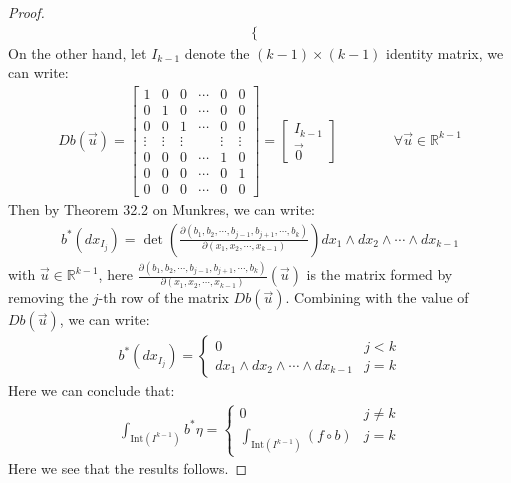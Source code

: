 \documentclass[15pt]{book}
\theoremstyle{break}
\theoremstyle{break}
\newcommand{\R}{\mathbb{R}}
\newcommand{\Int}{\text{Int}}
\newcommand{\bmat}[1]{\begin{bmatrix} #1 \end{bmatrix}}
\begin{document}
\begin{proof}
\begin{align*}
\begin{cases}
\end{cases}
\end{align*}
On the other hand, let $I_{k-1}$ denote the $(k-1)\times (k-1)$ identity matrix, we can write:
\begin{align*}
Db(\vec{u}) =\bmat{1&0&0 & \cdots & 0& 0\\
0&1&0 & \cdots & 0& 0\\
0&0&1 & \cdots & 0& 0\\
\vdots&\vdots&\vdots & & \vdots& \vdots\\
0&0&0 & \cdots & 1& 0\\
0&0&0 & \cdots & 0& 1\\
0&0&0 & \cdots & 0& 0}= \bmat{I_{k-1} \\ \vec{0}} \qquad\qquad \forall \vec{u}\in \R^{k-1}
\end{align*}
Then by Theorem 32.2 on Munkres, we can write:
\begin{align*}
b^*(dx_{I_j}) = \det\left(\frac{\partial (b_1, b_2,\cdots, b_{j-1}, b_{j+1}, \cdots, b_k)}{\partial (x_1,x_2,\cdots, x_{k-1})}\right) dx_1 \wedge dx_2 \wedge \cdots \wedge dx_{k-1}
\end{align*}
with $\vec{u}\in \R^{k-1}$, here $\frac{\partial (b_1, b_2,\cdots, b_{j-1}, b_{j+1}, \cdots, b_k)}{\partial (x_1,x_2,\cdots, x_{k-1})} (\vec{u})$ is the matrix formed by removing the $j$-th row of the matrix $Db(\vec{u})$. Combining with the value of $Db(\vec{u})$, we can write:
\begin{align*}
b^*(dx_{I_j}) = \begin{cases}
0 & j<k \\
dx_1 \wedge dx_2 \wedge \cdots \wedge dx_{k-1} & j=k
\end{cases}
\end{align*}
Here we can conclude that:
\begin{align*}
\int_{\Int(I^{k-1})} b^*\eta = \begin{cases}
0 & j\neq k\\
\int_{\Int(I^{k-1})}(f\circ b) & j=k
\end{cases}
\end{align*}
Here we see that the results follows.
\end{proof}
\end{document}

